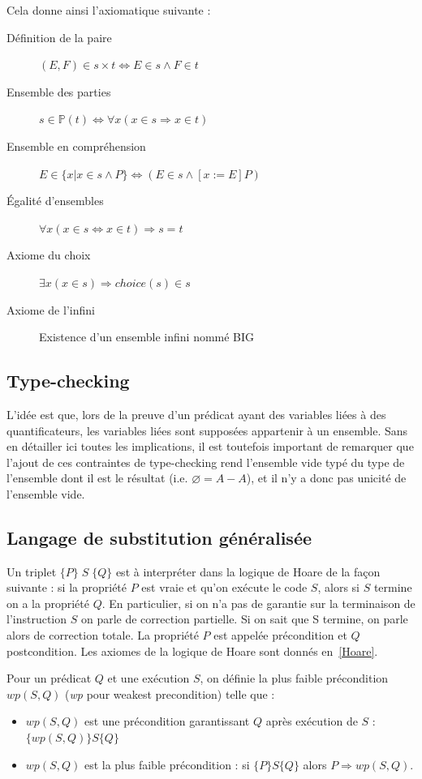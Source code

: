\documentclass[10pt,a4paper]{article}
\begin{document}
Cela donne ainsi l'axiomatique suivante :
\begin{description}
\item[Définition de la paire] $(E, F) \in s \times t \Leftrightarrow E \in s \wedge F \in t$
\item[Ensemble des parties] $s \in \mathbb{P}(t) \Leftrightarrow \forall x (x \in s \Rightarrow x \in t)$
\item[Ensemble en compréhension] $E \in \{ x | x \in s \wedge P \} \Leftrightarrow (E \in s \wedge [x:= E] P)$
\item[Égalité d'ensembles] $\forall x (x \in s \Leftrightarrow x \in t) \Rightarrow s = t$
\item[Axiome du choix] $\exists x  (x \in s) \Rightarrow choice(s) \in s$
\item[Axiome de l'infini] Existence d'un ensemble infini nommé BIG
\end{description}

\subsection{Type-checking}

L'idée est que, lors de la preuve d'un prédicat ayant des variables liées à des quantificateurs, les variables liées sont supposées appartenir à un ensemble.
Sans en détailler ici toutes les implications, il est toutefois important de remarquer que l'ajout de ces contraintes de type-checking rend l'ensemble vide typé du type de l'ensemble dont il est le résultat (i.e. $\varnothing = A - A$), et il n'y a donc pas unicité de l'ensemble vide. 

\label{SubstGen}
\subsection{Langage de substitution généralisée}

Un triplet $ \{P\}\;S\;\{Q\} $ est à interpréter dans la logique de Hoare de la façon suivante : si la propriété $P$ est vraie et qu'on exécute le code $S$, alors si $S$ termine on a la propriété $Q$. En particulier, si on n'a pas de garantie sur la terminaison de l'instruction $S$ on parle de correction partielle. Si on sait que S termine, on parle alors de correction totale. La propriété $P$ est appelée précondition et $Q$ postcondition. Les axiomes de la logique de Hoare sont donnés en~\cref{Hoare}.

Pour un prédicat $Q$ et une exécution $S$, on définie la plus faible précondition $wp(S, Q)$ (\emph{wp} pour weakest precondition) telle que :
\begin{itemize}
\item $wp(S, Q)$ est une précondition garantissant $Q$  après exécution de $S$ : $ \{ wp(S, Q) \} S \{ Q\}$
\item $wp(S, Q)$  est la plus faible précondition : si $\{ P \} S \{ Q \}$ alors $P \Rightarrow wp(S, Q)$.
\end{itemize}~
\end{document}
